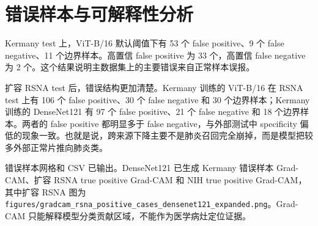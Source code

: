 \chapter{错误样本与可解释性分析}

Kermany test 上，ViT-B/16 默认阈值下有 53 个 false positive、9 个 false negative、11 个边界样本。高置信 false positive 为 33 个，高置信 false negative 为 2 个。这个结果说明主数据集上的主要错误来自正常样本误报。

扩容 RSNA test 后，错误结构更加清楚。Kermany 训练的 ViT-B/16 在 RSNA test 上有 106 个 false positive、30 个 false negative 和 30 个边界样本；Kermany 训练的 DenseNet121 有 97 个 false positive、21 个 false negative 和 18 个边界样本。两者的 false positive 都明显多于 false negative，与外部测试中 specificity 偏低的现象一致。也就是说，跨来源下降主要不是肺炎召回完全崩掉，而是模型把较多外部正常片推向肺炎类。

错误样本网格和 CSV 已输出。DenseNet121 已生成 Kermany 错误样本 Grad-CAM、扩容 RSNA true positive Grad-CAM 和 NIH true positive Grad-CAM，其中扩容 RSNA 图为 \texttt{figures/gradcam\_rsna\_positive\_cases\_densenet121\_expanded.png}。Grad-CAM 只能解释模型分类贡献区域，不能作为医学病灶定位证据。
